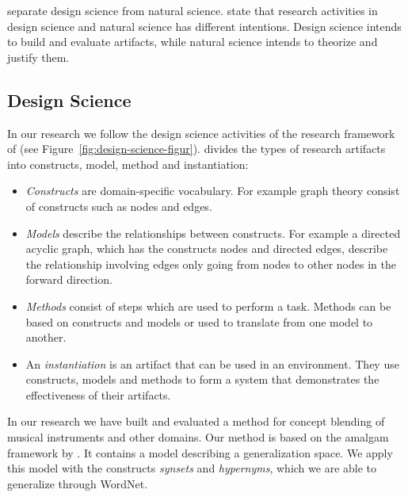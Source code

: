 \citet{simon1996sciences} separate design science from natural science.
\citet{march1995design} state that research activities in design science and natural science has different intentions. Design science intends to build and evaluate artifacts, while natural science intends to theorize and justify them.

\subsection{Design Science}

In our research we follow the design science activities of the research framework of \citet{march1995design} (see Figure~\ref{fig:design-science-figur}).
\citet{march1995design} divides the types of research artifacts into constructs, model, method and instantiation:
\begin{itemize}
\item \emph{Constructs} are domain-specific vocabulary. For example graph theory consist of constructs such as nodes and edges.
\item \emph{Models} describe the relationships between constructs. For example a directed acyclic graph, which has the constructs nodes and directed edges, describe the relationship involving edges only going from nodes to other nodes in the forward direction.
\item \emph{Methods} consist of steps which are used to perform a task. Methods can be based on constructs and models or used to translate from one model to another.
\item An \emph{instantiation} is an artifact that can be used in an environment. They use constructs, models and methods to form a system that demonstrates the effectiveness of their artifacts.
\end{itemize}

In our research we have built and evaluated a method for concept blending of musical instruments and other domains. Our method is based on the amalgam framework by \citet{ontanon2010amalgams}. It contains a model describing a generalization space. We apply this model with the constructs \emph{synsets} and \emph{hypernyms}, which we are able to generalize through WordNet. %

